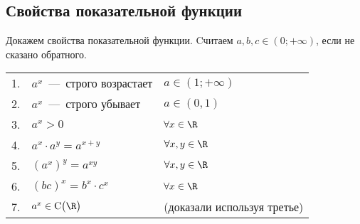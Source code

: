 \subsection{Свойства показательной функции}

\begin{theorem} Докажем свойства показательной функции. Cчитаем $a, b, c \in (0; +\infty)$, если не сказано обратного.
\begin{table}[h]
\begin{tabular}{cll}
1. & $a^x$~---~строго возрастает & $a \in (1; +\infty)$ \\ 
2. & $a^x$~---~строго убывает & $a \in (0, 1)$ \\
3. & $a^x > 0$ & $\forall x \in \R$ \\
4. & $a^x \cdot a^y = a^{x + y}$ & $\forall x, y \in \R$ \\
5. & $(a^x)^y = a^{xy}$ & $\forall x, y \in \R$ \\
6. & $(bc)^x = b^x \cdot c^x$ & $\forall x \in \R$ \\
7. & $a^x \in \text{C} \big( \R \big)$ & (доказали используя третье) \\
\end{tabular}
\end{table}
\end{theorem}

